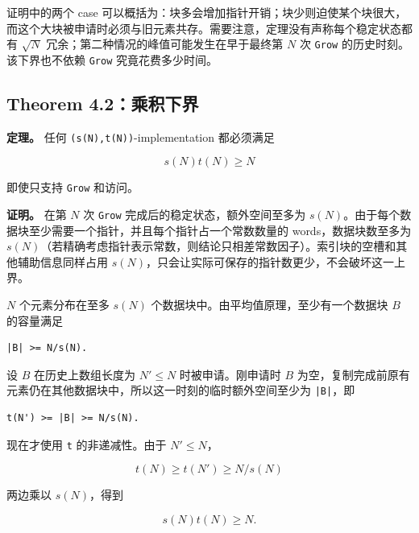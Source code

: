 \documentclass[UTF8,11pt,a4paper]{ctexart}
\begin{document}
证明中的两个 case 可以概括为：块多会增加指针开销；块少则迫使某个块很大，而这个大块被申请时必须与旧元素共存。需要注意，定理没有声称每个稳定状态都有 $\sqrt{N}$ 冗余；第二种情况的峰值可能发生在早于最终第 $N$ 次 \textnormal{\texttt{Grow}} 的历史时刻。该下界也不依赖 \textnormal{\texttt{Grow}} 究竟花费多少时间。\par

\subsection{Theorem 4.2：乘积下界}

\textbf{定理。} 任何 \textnormal{\texttt{(s(N),t(N))}}-implementation 都必须满足\par

\[
  s(N)t(N) \geq  N
\]

即使只支持 \textnormal{\texttt{Grow}} 和访问。\par

\textbf{证明。} 在第 $N$ 次 \textnormal{\texttt{Grow}} 完成后的稳定状态，额外空间至多为 $s(N)$。由于每个数据块至少需要一个指针，并且每个指针占一个常数数量的 words，数据块数至多为 $s(N)$（若精确考虑指针表示常数，则结论只相差常数因子）。索引块的空槽和其他辅助信息同样占用 $s(N)$，只会让实际可保存的指针数更少，不会破坏这一上界。\par

$N$ 个元素分布在至多 $s(N)$ 个数据块中。由平均值原理，至少有一个数据块 $B$ 的容量满足\par

\begin{Verbatim}[fontsize=\scriptsize]
|B| >= N/s(N).
\end{Verbatim}

设 $B$ 在历史上数组长度为 $N'\leq N$ 时被申请。刚申请时 $B$ 为空，复制完成前原有元素仍在其他数据块中，所以这一时刻的临时额外空间至少为 \textnormal{\texttt{|B|}}，即\par

\begin{Verbatim}[fontsize=\scriptsize]
t(N') >= |B| >= N/s(N).
\end{Verbatim}

现在才使用 \textnormal{\texttt{t}} 的非递减性。由于 $N'\leq N$，\par

\[
  t(N) \geq  t(N') \geq  N/s(N)
\]

两边乘以 $s(N)$，得到\par

\[
  s(N)t(N) \geq  N.
\]
\end{document}
